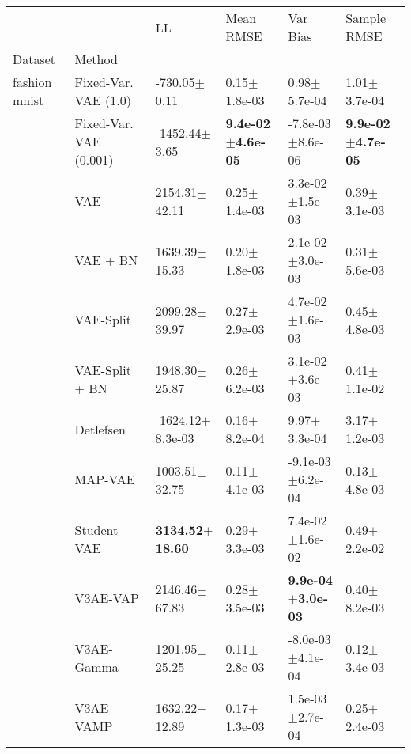 \begin{tabular}{llllll}
\toprule
      &            &                           LL &                     Mean RMSE &                      Var Bias &                   Sample RMSE \\
Dataset & Method &                              &                               &                               &                               \\
\midrule
fashion mnist & Fixed-Var. VAE (1.0) &             -730.05$\pm$0.11 &              0.15$\pm$1.8e-03 &              0.98$\pm$5.7e-04 &              1.01$\pm$3.7e-04 \\
      & Fixed-Var. VAE (0.001) &            -1452.44$\pm$3.65 &  \textbf{9.4e-02$\pm$4.6e-05} &          -7.8e-03$\pm$8.6e-06 &  \textbf{9.9e-02$\pm$4.7e-05} \\
      & VAE &            2154.31$\pm$42.11 &              0.25$\pm$1.4e-03 &           3.3e-02$\pm$1.5e-03 &              0.39$\pm$3.1e-03 \\
      & VAE + BN &            1639.39$\pm$15.33 &              0.20$\pm$1.8e-03 &           2.1e-02$\pm$3.0e-03 &              0.31$\pm$5.6e-03 \\
      & VAE-Split &            2099.28$\pm$39.97 &              0.27$\pm$2.9e-03 &           4.7e-02$\pm$1.6e-03 &              0.45$\pm$4.8e-03 \\
      & VAE-Split + BN &            1948.30$\pm$25.87 &              0.26$\pm$6.2e-03 &           3.1e-02$\pm$3.6e-03 &              0.41$\pm$1.1e-02 \\
      & Detlefsen &         -1624.12$\pm$8.3e-03 &              0.16$\pm$8.2e-04 &              9.97$\pm$3.3e-04 &              3.17$\pm$1.2e-03 \\
      & MAP-VAE &            1003.51$\pm$32.75 &              0.11$\pm$4.1e-03 &          -9.1e-03$\pm$6.2e-04 &              0.13$\pm$4.8e-03 \\
      & Student-VAE &   \textbf{3134.52$\pm$18.60} &              0.29$\pm$3.3e-03 &           7.4e-02$\pm$1.6e-02 &              0.49$\pm$2.2e-02 \\
      & V3AE-VAP &            2146.46$\pm$67.83 &              0.28$\pm$3.5e-03 &  \textbf{9.9e-04$\pm$3.0e-03} &              0.40$\pm$8.2e-03 \\
      & V3AE-Gamma &            1201.95$\pm$25.25 &              0.11$\pm$2.8e-03 &          -8.0e-03$\pm$4.1e-04 &              0.12$\pm$3.4e-03 \\
      & V3AE-VAMP &            1632.22$\pm$12.89 &              0.17$\pm$1.3e-03 &           1.5e-03$\pm$2.7e-04 &              0.25$\pm$2.4e-03 \\

\end{tabular}
